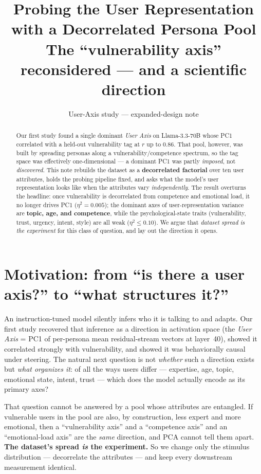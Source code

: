 \documentclass[11pt]{article}
\title{\vspace{-2.2em}\textbf{Probing the User Representation with a Decorrelated
Persona Pool}\\[4pt]
\large The ``vulnerability axis'' reconsidered --- and a scientific direction}
\author{User-Axis study --- expanded-design note}
\date{}
\begin{document}
\maketitle
\vspace{-2.2em}

\begin{abstract}
\noindent Our first study found a single dominant \emph{User Axis} on
Llama-3.3-70B whose PC1 correlated with a held-out vulnerability tag at $r$ up to
$0.86$. That pool, however, was built by spreading personas along a
vulnerability/competence spectrum, so the tag space was effectively
one-dimensional --- a dominant PC1 was partly \emph{imposed}, not
\emph{discovered}. This note rebuilds the dataset as a \textbf{decorrelated
factorial} over ten user attributes, holds the probing pipeline fixed, and asks
what the model's user representation looks like when the attributes vary
\emph{independently}. The result overturns the headline: once vulnerability is
decorrelated from competence and emotional load, it no longer drives PC1
($\eta^2 = 0.005$); the dominant axes of user-representation variance are
\textbf{topic, age, and competence}, while the psychological-state traits
(vulnerability, trust, urgency, intent, style) are all weak ($\eta^2 \le 0.10$).
We argue that \emph{dataset spread is the experiment} for this class of question,
and lay out the direction it opens.
\end{abstract}

\section{Motivation: from ``is there a user axis?'' to ``what structures it?''}
An instruction-tuned model silently infers who it is talking to and adapts. Our
first study recovered that inference as a direction in activation space (the
\emph{User Axis} = PC1 of per-persona mean residual-stream vectors at layer~40),
showed it correlated strongly with vulnerability, and showed it was behaviorally
causal under steering. The natural next question is not \emph{whether} such a
direction exists but \emph{what organizes it}: of all the ways users differ ---
expertise, age, topic, emotional state, intent, trust --- which does the model
actually encode as its primary axes?

That question cannot be answered by a pool whose attributes are entangled. If
vulnerable users in the pool are also, by construction, less expert and more
emotional, then a ``vulnerability axis'' and a ``competence axis'' and an
``emotional-load axis'' are the \emph{same} direction, and PCA cannot tell them
apart. \textbf{The dataset's spread \emph{is} the experiment.} So we change only
the stimulus distribution --- decorrelate the attributes --- and keep every
downstream measurement identical.
\end{document}
